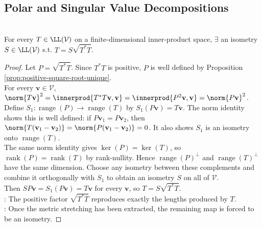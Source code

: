 \subsection{Polar and Singular Value Decompositions}

\begin{theorem} \label{thm:polar-decomposition} \\
For every $T\in\LL(\mathcal{V})$ on a finite-dimensional inner-product space, $\exists$ an isometry $S\in\LL(\mathcal{V})$ s.t. $T=S\sqrt{T^*T}$.
\begin{proof}
Let $P=\sqrt{T^*T}$. Since $T^*T$ is positive, $P$ is well defined by Proposition \ref{prop:positive-square-root-unique}.\\
For every $\mathbf{v}\in\mathcal{V}$, $\norm{T\mathbf{v}}^2 =\innerprod{T^*T\mathbf{v},\mathbf{v}} =\innerprod{P^2\mathbf{v},\mathbf{v}} =\norm{P\mathbf{v}}^2$.\\
Define $S_1:\operatorname{range}(P)\to\operatorname{range}(T)$ by $S_1(P\mathbf{v})=T\mathbf{v}$. The norm identity shows this is well defined: if $P\mathbf{v}_1=P\mathbf{v}_2$, then $\norm{T(\mathbf{v}_1-\mathbf{v}_2)}=\norm{P(\mathbf{v}_1-\mathbf{v}_2)}=0$. It also shows $S_1$ is an isometry onto $\operatorname{range}(T)$.\\
The same norm identity gives $\ker(P)=\ker(T)$, so $\operatorname{rank}(P)=\operatorname{rank}(T)$ by rank-nullity. Hence $\operatorname{range}(P)^{\perp}$ and $\operatorname{range}(T)^{\perp}$ have the same dimension. Choose any isometry between these complements and combine it orthogonally with $S_1$ to obtain an isometry $S$ on all of $\mathcal{V}$.\\
Then $SP\mathbf{v}=S_1(P\mathbf{v})=T\mathbf{v}$ for every $\mathbf{v}$, so $T=S\sqrt{T^*T}$.\\
: The positive factor $\sqrt{T^*T}$ reproduces exactly the lengths produced by $T$.\\
: Once the metric stretching has been extracted, the remaining map is forced to be an isometry.
\end{proof}
\end{theorem}

